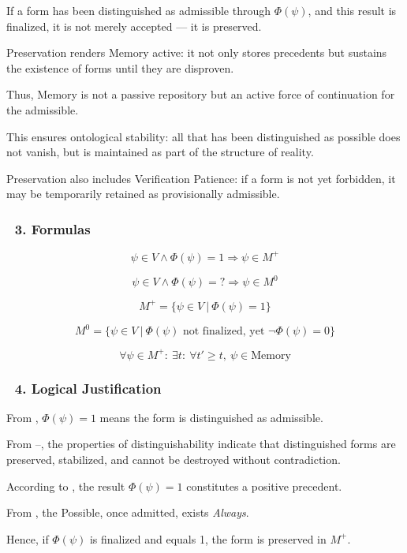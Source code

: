 \documentclass[12pt]{article}
\begin{document}
If a form has been distinguished as admissible through $\Phi(\psi)$, and this result is finalized, it is not merely accepted — it is preserved.

Preservation renders Memory active: it not only stores precedents but sustains the existence of forms until they are disproven.

Thus, Memory is not a passive repository but an active force of continuation for the admissible.

This ensures ontological stability: all that has been distinguished as possible does not vanish, but is maintained as part of the structure of reality.

Preservation also includes Verification Patience: if a form is not yet forbidden, it may be temporarily retained as provisionally admissible.

\subsubsection*{🔹 3. Formulas}

\[
\psi \in V \land \Phi(\psi) = 1 \Rightarrow \psi \in M^+
\]

\[
\psi \in V \land \Phi(\psi) = ? \Rightarrow \psi \in M^0
\]

\[
M^+ = \{\psi \in V\ |\ \Phi(\psi) = 1\}
\]

\[
M^0 = \{\psi \in V\ |\ \Phi(\psi) \text{ not finalized, yet } \neg\Phi(\psi) = 0\}
\]

\[
\forall \psi \in M^+:\ \exists t:\ \forall t' \geq t,\ \psi \in \text{Memory}
\]

\subsubsection*{🔹 4. Logical Justification}

From \text{[11.1.1]}, $\Phi(\psi) = 1$ means the form is distinguished as admissible.

From \text{[9.1]}–\text{[9.3]}, the properties of distinguishability indicate that distinguished forms are preserved, stabilized, and cannot be destroyed without contradiction.

According to \text{[11.10]}, the result $\Phi(\psi) = 1$ constitutes a positive precedent.

From \text{[4.4]}, the Possible, once admitted, exists \textit{Always}.

Hence, if $\Phi(\psi)$ is finalized and equals 1, the form is preserved in $M^+$.
\end{document}
